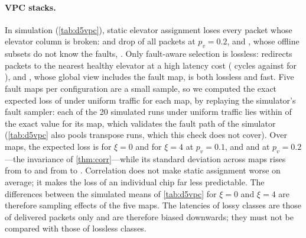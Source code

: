 \paragraph{VPC stacks.} In simulation (\cref{tab:d5vpc}), static elevator assignment loses every packet whose elevator column is broken:  and  drop  of all packets at $p_v=0.2$, and , whose offline subsets do not know the faults, . Only fault-aware selection is lossless:  redirects packets to the nearest healthy elevator at a high latency cost ( cycles against  for ), and , whose global view includes the fault map, is both lossless and fast. Five fault maps per configuration are a small sample, so we computed the exact expected loss of  under uniform traffic for each map, by replaying the simulator's fault sampler: each of the 20 simulated  runs under uniform traffic lies within  of the exact value for its map, which validates the fault path of the simulator (\cref{tab:d5vpc} also pools transpose runs, which this check does not cover). Over  maps, the expected loss is  for $\xi=0$ and  for $\xi=4$ at $p_v=0.1$, and  and  at $p_v=0.2$---the invariance of \cref{thm:corr}---while its standard deviation across maps rises from  to  and from  to . Correlation does not make static assignment worse on average; it makes the loss of an individual chip far less predictable. The differences between the simulated means of \cref{tab:d5vpc} for $\xi=0$ and $\xi=4$ are therefore sampling effects of the five maps. The latencies of lossy classes are those of delivered packets only and are therefore biased downwards; they must not be compared with those of lossless classes.

\begin{table}[tbp]
\centering
\caption{VPC classes under correlated TSV faults (), 16 elevators, PIR 0.006, uniform and transpose traffic, five seeds. Loss: fraction of injected packets dropped because the assigned elevator column is broken. $S_{\mathrm{eff}}^{\mathrm{TSV}}$: effective number of TSV columns used (ERA).}
\label{tab:d5vpc}
\small

\end{table}

